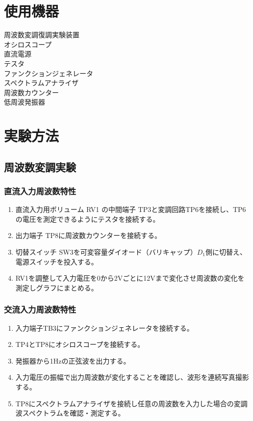 \section{使用機器}
周波数変調復調実験装置\\
オシロスコープ\\
直流電源\\
テスタ\\
ファンクションジェネレータ\\
スペクトラムアナライザ\\
周波数カウンター\\
低周波発振器\\

\section{実験方法}
\subsection{周波数変調実験}
\subsubsection{直流入力周波数特性}
\begin{enumerate}
  \item 直流入力用ボリューム RV1 の中間端子 TP3と変調回路TP6を接続し、TP6の電圧を測定できるようにテスタを接続する。\\
  \item 出力端子 TP8に周波数カウンターを接続する。\\
  \item 切替スイッチ SW3を可変容量ダイオード（バリキャップ）$D_1$側に切替え、電源スイッチを投入する。\\
  \item RV1を調整して入力電圧を0から2Vごとに12Vまで変化させ周波数の変化を測定しグラフにまとめる。\\
\end{enumerate}

\subsubsection{交流入力周波数特性}
\begin{enumerate}
  \item 入力端子TB3にファンクションジェネレータを接続する。\\
  \item TP4とTP8にオシロスコープを接続する。\\
  \item 発振器から1Hzの正弦波を出力する。\\
  \item 入力電圧の振幅で出力周波数が変化することを確認し、波形を連続写真撮影する。\\
  \item TP8にスペクトラムアナライザを接続し任意の周波数を入力した場合の変調波スペクトラムを確認・測定する。\\
\end{enumerate}

